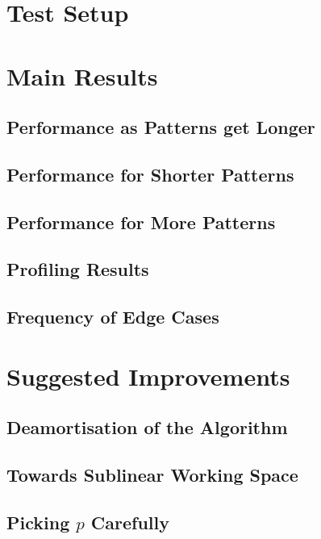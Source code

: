 \documentclass[ %
                    author={Dominic Joseph Moylett},
                    degree={MEng},
                     title={Dictionary Matching with Fingerprints},
                  subtitle={An Empirical Analysis},
                      type={Research},
                      year={2014} ]{dissertation}
\begin{document}
\section{Test Setup}

\section{Main Results}

\subsection{Performance as Patterns get Longer}

\subsection{Performance for Shorter Patterns}

\subsection{Performance for More Patterns}

\subsection{Profiling Results}

\subsection{Frequency of Edge Cases}

\section{Suggested Improvements}

\subsection{Deamortisation of the Algorithm}

\subsection{Towards Sublinear Working Space}

\subsection{Picking $p$ Carefully}
\end{document}
